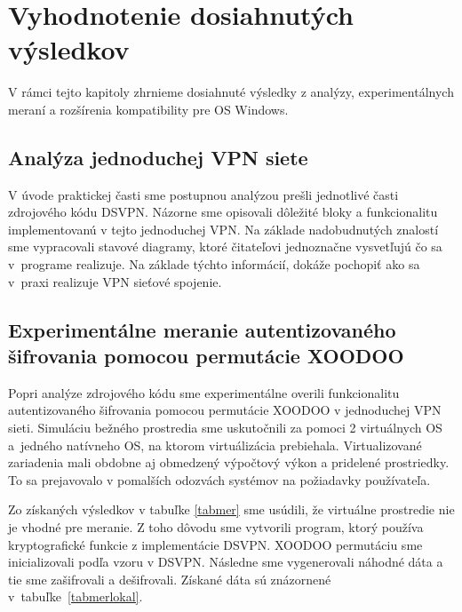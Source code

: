 \chapter{Vyhodnotenie dosiahnutých výsledkov}
V rámci tejto kapitoly zhrnieme dosiahnuté výsledky z analýzy, experimentálnych meraní a rozšírenia kompatibility pre OS Windows.
\section{Analýza jednoduchej VPN siete}
V úvode praktickej časti sme postupnou analýzou prešli jednotlivé časti zdrojového kódu DSVPN. Názorne sme opisovali dôležité bloky a funkcionalitu implementovanú v tejto jednoduchej VPN. Na základe nadobudnutých znalostí sme vypracovali stavové diagramy, ktoré čitateľovi jednoznačne vysvetľujú čo sa v~programe realizuje. Na základe týchto informácií, dokáže pochopiť ako sa v~praxi realizuje VPN sieťové spojenie.
\section{Experimentálne meranie autentizovaného šifrovania pomocou permutácie XOODOO}
Popri analýze zdrojového kódu sme experimentálne overili funkcionalitu autentizovaného šifrovania pomocou permutácie XOODOO v jednoduchej VPN sieti.  Simuláciu bežného prostredia sme uskutočnili za pomoci 2 virtuálnych OS a~jedného natívneho OS, na ktorom virtuálizácia prebiehala. Virtualizované zariadenia mali obdobne aj obmedzený výpočtový výkon a pridelené prostriedky. To sa prejavovalo v pomalších odozvách systémov na požiadavky používateľa. 

Zo získaných výsledkov v tabuľke \ref{tabmer} sme usúdili, že virtuálne prostredie nie je vhodné pre meranie. Z toho dôvodu sme vytvorili program, ktorý používa kryptografické funkcie z implementácie DSVPN. XOODOO permutáciu sme inicializovali podľa vzoru v DSVPN. Následne sme vygenerovali náhodné dáta a tie sme zašifrovali a dešifrovali. Získané dáta sú znázornené v~tabuľke~\ref{tabmerlokal}. 

